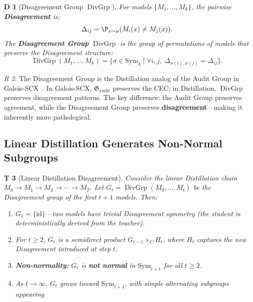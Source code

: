 \documentclass[12pt,a4paper]{article}
\newtheorem{theorem}Theorem[section]
\newtheorem{definition}[theorem]Definition
\theoremstyle{remark}
\newtheorem{remark}[theorem]Remark
\newcommand{\Sym}{\mathrm{Sym}}
\newcommand{\AuditGrp}{\mathfrak{G}_{\mathrm{audit}}}
\DeclareMathOperator{\DivGrp}{DivGrp}
\begin{document}
\begin{definition}[Disagreement Group \(\DivGrp\)]
For models \(\{M_1, \ldots, M_k\}\), the pairwise \textbf{Disagreement} is:
\begin{equation}
    \Delta_{ij} = \P_{x \sim \mu}(M_i(x) \neq M_j(x)).
\end{equation}
The \textbf{Disagreement Group} \(\DivGrp\) is the group of permutations of models that preserve the Disagreement structure:
\begin{equation}
    \DivGrp(M_1,\ldots,M_k) = \{\sigma \in \Sym_k \mid \forall i,j,\; \Delta_{\sigma(i),\sigma(j)} = \Delta_{ij}\}.
\end{equation}
\end{definition}

\begin{remark}
The Disagreement Group is the Distillation analog of the Audit Group in Galois-SCX~\cite{scx_galois}. In Galois-SCX, \(\AuditGrp\) preserves the CEC; in Distillation, \(\DivGrp\) preserves disagreement patterns. The key difference: the Audit Group preserves agreement, while the Disagreement Group preserves \textbf{disagreement}---making it inherently more pathological.
\end{remark}

\subsection{Linear Distillation Generates Non-Normal Subgroups}
\begin{theorem}[Linear Distillation Disagreement]\label{thm:chain_divergence}
Consider the linear Distillation chain \(M_0 \to M_1 \to M_2 \to \cdots \to M_T\). Let \(G_t = \DivGrp(M_0, \ldots, M_t)\) be the Disagreement group of the first \(t+1\) models. Then:
\begin{enumerate}[label=(\roman*),itemsep=3pt]
    \item \(G_1 = \{\mathrm{id}\}\)---two models have trivial Disagreement symmetry (the student is deterministically derived from the teacher).
    \item For \(t \geq 2\), \(G_t\) is a semidirect product \(G_{t-1} \times_{C} H_t\), where \(H_t\) captures the new Disagreement introduced at step \(t\).
    \item \textbf{Non-normality:} \(G_t\) is \textbf{not normal} in \(\Sym_{t+1}\) for all \(t \geq 2\).
    \item As \(t \to \infty\), \(G_t\) grows toward \(\Sym_{t+1}\), with simple alternating subgroups appearing.
\end{enumerate}
\end{theorem}
\end{document}
